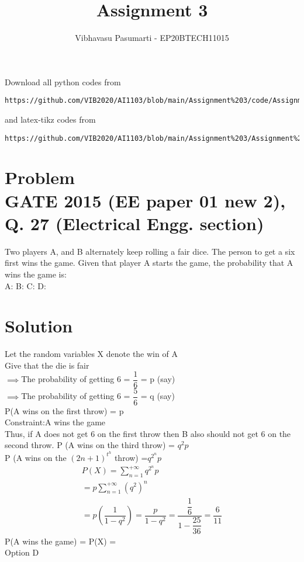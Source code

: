 \documentclass[journal,12pt,twocolumn]{IEEEtran}
\begin{document}
\title{Assignment 3}
\author{Vibhavasu Pasumarti - EP20BTECH11015}
\maketitle
\newpage
\bigskip
\renewcommand{\thefigure}{\theenumi}
\renewcommand{\thetable}{\theenumi}
Download all python codes from 
\begin{lstlisting}
https://github.com/VIB2020/AI1103/blob/main/Assignment%203/code/Assignment%203.py
\end{lstlisting}
%
and latex-tikz codes from 
%
\begin{lstlisting}
https://github.com/VIB2020/AI1103/blob/main/Assignment%203/Assignment%203.pdf
\end{lstlisting}
\section{\Large Problem\\ \large GATE 2015 (EE paper 01 new 2), Q. 27 (Electrical Engg. section)}

Two players A, and B alternately keep rolling a fair dice. The person to get a six first wins the game. Given that player A starts the game, the probability that A wins the game is:\\[5pt]
A: \hspace{1cm}
B: \hspace{1cm}
C: \hspace{1cm}
D: 
\section{\Large Solution}
Let the random variables X denote the win of A\\
Give that the die is fair\\
$\implies$The probability of getting 6 = $\dfrac{1}{6}$ = p (say)\\[5pt]
$\implies$The probability of getting 6 = $\dfrac{5}{6}$ = q (say)\\[5pt]
P(A wins on the first throw) = p\\[5pt]
\large Constraint:\normalsize A wins the game\\[5pt]
Thus, if A does not get 6 on the first throw then B also should not get 6 on the second throw.
P (A wins on the third throw) = $q^2 p$\\
\imples P (A wins on the $(2n + 1)^t^h $ throw) =\large $q^2^n p$\\[6pt]
\begin{align}
P(X) = \sum_{n=1}^{+\infty} q^2^n p \\[5pt]
= p \sum_{n=1}^{+\infty} (q^2)^n\\[5pt]
= p \left(\dfrac{1}{1 - q^2}\right) = \dfrac{p}{1 - q^2}
=\dfrac{\dfrac{1}{6}}{1 - \dfrac{25}{36}} = \dfrac{6}{11}
\end{align}
\centering
\Large P(A wins the game) = P(X) = \\[6pt]
Option D
\end{document}
